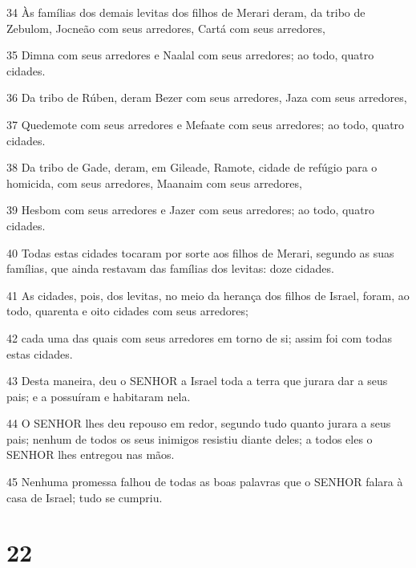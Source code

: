 \par 34 Às famílias dos demais levitas dos filhos de Merari deram, da tribo de Zebulom, Jocneão com seus arredores, Cartá com seus arredores,
\par 35 Dimna com seus arredores e Naalal com seus arredores; ao todo, quatro cidades.
\par 36 Da tribo de Rúben, deram Bezer com seus arredores, Jaza com seus arredores,
\par 37 Quedemote com seus arredores e Mefaate com seus arredores; ao todo, quatro cidades.
\par 38 Da tribo de Gade, deram, em Gileade, Ramote, cidade de refúgio para o homicida, com seus arredores, Maanaim com seus arredores,
\par 39 Hesbom com seus arredores e Jazer com seus arredores; ao todo, quatro cidades.
\par 40 Todas estas cidades tocaram por sorte aos filhos de Merari, segundo as suas famílias, que ainda restavam das famílias dos levitas: doze cidades.
\par 41 As cidades, pois, dos levitas, no meio da herança dos filhos de Israel, foram, ao todo, quarenta e oito cidades com seus arredores;
\par 42 cada uma das quais com seus arredores em torno de si; assim foi com todas estas cidades.
\par 43 Desta maneira, deu o SENHOR a Israel toda a terra que jurara dar a seus pais; e a possuíram e habitaram nela.
\par 44 O SENHOR lhes deu repouso em redor, segundo tudo quanto jurara a seus pais; nenhum de todos os seus inimigos resistiu diante deles; a todos eles o SENHOR lhes entregou nas mãos.
\par 45 Nenhuma promessa falhou de todas as boas palavras que o SENHOR falara à casa de Israel; tudo se cumpriu.

\chapter{22}

